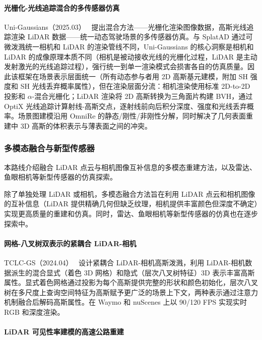 \paragraph{光栅化-光线追踪混合的多传感器仿真}

Uni-Gaussians（2025.03）~\cite{2503_08317} 提出混合方法——光栅化渲染图像数据，高斯光线追踪渲染 LiDAR 数据——统一动态驾驶场景的多传感器仿真。与 SplatAD 通过可微泼溅统一相机和 LiDAR 的渲染管线不同，Uni-Gaussians 的核心洞察是相机和 LiDAR 的成像原理本质不同（相机是被动接收光线的光栅化过程，LiDAR 是主动发射激光的光线追踪过程），强行统一到单一渲染模式会损害各自的仿真质量。因此该框架在场景表示层面统一（所有动态参与者用 2D 高斯基元建模，附加 SH 强度和 SH 光线丢弃概率属性），但在渲染层面分流：相机渲染使用标准 2D-to-2D 投影和 $\alpha$-混合光栅化；LiDAR 渲染将 2D 高斯转换为三角面片构建 BVH，通过 OptiX 光线追踪计算射线-高斯交点，逐射线前向后积分深度、强度和光线丢弃概率。场景图建模沿用 OmniRe 的静态/刚性/非刚性分解，同时解决了几何表面重建中 3D 高斯的体积表示与薄表面之间的冲突。

\subsubsection{多模态融合与新型传感器}

本路线介绍融合 LiDAR 点云与相机图像互补信息的多模态重建方法，以及雷达、鱼眼相机等新型传感器的仿真探索。

除了单独处理 LiDAR 或相机，多模态融合方法旨在利用 LiDAR 点云和相机图像的互补信息（LiDAR 提供精确几何但缺乏纹理，相机提供丰富颜色但深度不确定）实现更高质量的重建和仿真。同时，雷达、鱼眼相机等新型传感器的仿真也在逐步探索中。

\paragraph{网格-八叉树双表示的紧耦合 LiDAR-相机}

TCLC-GS（2024.04）~\cite{2404_02410} 设计紧耦合 LiDAR-相机高斯泼溅，利用 LiDAR-相机数据派生的混合显式（着色 3D 网格）和隐式（层次八叉树特征）3D 表示丰富高斯属性。显式着色网格通过投影为每个高斯提供完整的形状和颜色初始化，层次八叉树在多尺度上查询空间特征为高斯赋予更广泛的场景上下文，两种表示通过注意力机制融合后解码高斯属性。在 Waymo 和 nuScenes 上以 90/120 FPS 实现实时 RGB 和深度渲染。

\paragraph{LiDAR 可见性率建模的高速公路重建}

